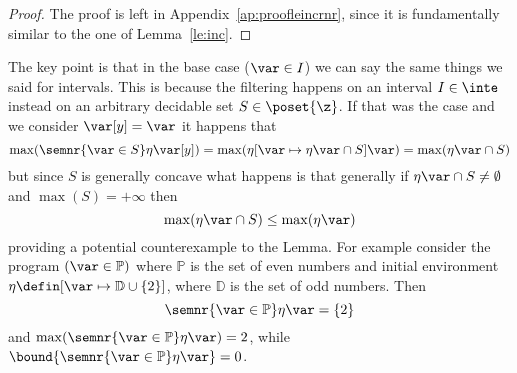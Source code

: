 \begin{proof}
  The proof is left in Appendix~\ref{ap:proofleincrnr}, since it is
  fundamentally similar to the one of Lemma~\ref{le:inc}. 
\end{proof}

\begin{remark}
    The key point is that in the base case
  (\(\var\in I\)) we can say the same things we said for
  intervals. This is because the filtering happens on an interval
  \(I \in \inte\) instead on an arbitrary decidable set
  \(S \in \poset{\z}\). If that was the case and we consider
  \(\var[y] = \var\) it happens that
  \begin{equation}
    \max(\semnr{\var\in S}\eta\var[y]) = \max(\eta[\var \mapsto \eta\var \cap S]\var) = \max(\eta\var \cap S)
  \end{equation}
  but since \(S\) is generally concave what happens is that generally
  if \(\eta \var \cap S \neq \emptyset\) and \(\max(S) = +\infty\) then
  \begin{equation}
    \max(\eta\var \cap S) \leq \max(\eta\var)
  \end{equation}
  providing a potential counterexample to the Lemma. For example
  consider the program \((\var\in\mathbb{P})\)
  where \(\mathbb{P}\) is the set of even numbers and initial
  environment \({\eta \defin [\var\mapsto \mathbb{D} \cup \{2\}]}\),
  where \(\mathbb{D}\) is the set of odd numbers. Then
  \begin{equation*}
    {\semnr{\var\in\mathbb{P}}\eta\var} = \{2\}
  \end{equation*}
  and \(\max({\semnr{\var\in\mathbb{P}}\eta\var}) = 2\), while
  \(\bound{\semnr{\var\in\mathbb{P}}\eta\var} = 0\).

  \medskip


\end{remark}
